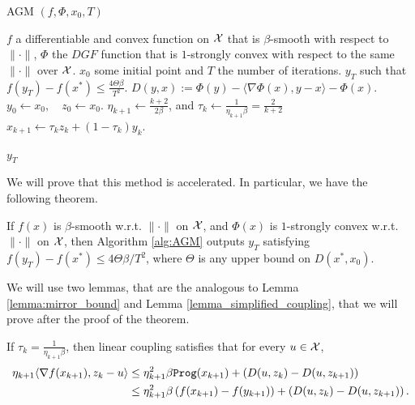 \begin{algorithm}[H]\label{alg:AGM}
\scriptsize
\caption{AGM $(f, \Phi, x_0, T)$}
   \label{alg:AGM}
   \begin{algorithmic}[1]
   \REQUIRE $f$ a differentiable and convex function on $\mathcal{X}$ that is $\beta$-smooth with respect to $\|\cdot\|$, $\Phi$ the $DGF$ function that is $1$-strongly convex with respect to the same $\|\cdot\|$ over $\mathcal{X}$. $x_0$ some initial point and $T$ the number of iterations.
   \ENSURE $y_T$ such that $f(y_T) -f(x^\ast) \leq \frac{4\Theta \beta}{T^2}$.
   \STATE $D(y, x) := \Phi(y) - \langle \nabla \Phi(x), y-x\rangle - \Phi(x).$
   \STATE $y_0 \gets x_0, \quad z_0 \gets x_0$.
       \STATE $\eta_{k+1} \gets \frac{k+2}{2\beta}$, and $\tau_k \gets \frac{1}{\eta_{k+1}\beta} = \frac{2}{k+2}$
       \STATE $x_{k+1} \gets \tau_k z_k + (1-\tau_k)y_k$.

   \ENDFOR
    $y_T$
\end{algorithmic}
\end{algorithm}

We will prove that this method is accelerated. In particular, we have the following theorem.

\begin{theorem}\label{thm:linear_coupling}
    If $f(x)$ is $\beta$-smooth w.r.t. $\|\cdot\|$ on $\mathcal{X}$, and $\Phi(x)$ is $1$-strongly convex w.r.t. $\|\cdot\|$ on $\mathcal{X}$, then Algorithm \ref{alg:AGM} outputs $y_T$ satisfying $f(y_T) - f(x^\ast) \leq 4 \Theta \beta /T^2$, where $\Theta$ is any upper bound on $D(x^\ast, x_0)$.
\end{theorem}

We will use two lemmas, that are the analogous to Lemma \ref{lemma:mirror_bound} and Lemma \ref{lemma_simplified_coupling}, that we will prove after the proof of the theorem.

\begin{lemma}\label{lemma:mirror_bound_general}
    If $\tau_k = \frac{1}{\eta_{k+1}\beta}$, then linear coupling satisfies that for every $u \in \mathcal{X}$,
    \begin{align*}\label{actual_regret_linear_coupling}
        \begin{aligned}
            \eta_{k+1} \langle \nabla f(x_{k+1}), z_{k} - u \rangle &\leq \eta^2_{k+1}\beta {\tt{Prog}}(x_{k+1}) + \left( D(u, z_k) - D(u, z_{k+1})\right) \\
                                                                &\leq \eta_{k+1}^2\beta \left( f(x_{k+1}) - f(y_{k+1})\right) + \left( D(u, z_k) - D(u, z_{k+1})\right).
        \end{aligned}
    \end{align*}
\end{lemma}

